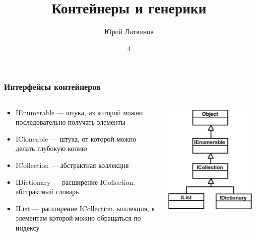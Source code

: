 \documentclass[xetex,mathserif,serif]{beamer}
\title{Контейнеры и генерики}
\author{Юрий Литвинов}
\date{4}
\begin{document}
	\frame{\titlepage}

	\begin{frame}
		\frametitle{Интерфейсы контейнеров}
		\begin{columns}
			\begin{column}{0.65\textwidth}
				\begin{itemize}
					\item IEnumerable --- штука, из которой можно последовательно получать элементы
					\item ICloneable --- штука, от которой можно делать глубокую копию
					\item ICollection --- абстрактная коллекция
					\item IDictionary --- расширение ICollection, абстрактный словарь
					\item IList --- расширение ICollection, коллекция, к элементам которой можно обращаться по индексу
				\end{itemize}
			\end{column}
			\begin{column}{0.3\textwidth}
				\includegraphics[width=\textwidth]{interfaces.png}
			\end{column}
		\end{columns}
	\end{frame}
\end{document}
